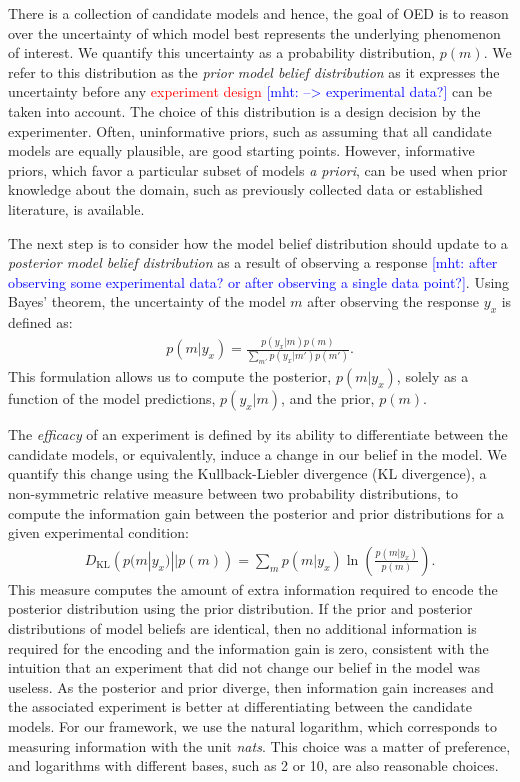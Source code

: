 \documentclass{article}
\newcommand{\red}[1]{\textcolor{Red}{#1}}
\newcommand{\mht}[1]{\textcolor{Blue}{[mht: #1]}}
\begin{document}
There is a collection of candidate models and hence, the goal of OED is to reason over the uncertainty of which model best represents the underlying phenomenon of interest. We quantify this uncertainty as a probability distribution, $p(m)$. We refer to this distribution as the \emph{prior model belief distribution} as it expresses the uncertainty before any \red{experiment design} \mht{--> experimental data?} can be taken into account. The choice of this distribution is a design decision by the experimenter. Often, uninformative priors, such as assuming that all candidate models are equally plausible, are good starting points. However, informative priors, which favor a particular subset of models \emph{a priori}, can be used when prior knowledge about the domain, such as previously collected data or established literature, is available. 

The next step is to consider how the model belief distribution should update to a \emph{posterior model belief distribution} as a result of observing a response \mht{after observing some experimental data? or after observing a single data point?}. Using Bayes' theorem, the uncertainty of the model $m$ after observing the response $y_x$ is defined as:
\begin{align}
p(m|y_x) = \frac{p(y_x|m)p(m)}{\sum\limits_{m'} p(y_x|m')p(m')}. \label{eq:bayes}
\end{align}
This formulation allows us to compute the posterior, $p(m|y_x)$, solely as a function of the model predictions, $p(y_x|m)$, and the prior, $p(m)$.

The \emph{efficacy} of an experiment is defined by its ability to differentiate between the candidate models, or equivalently, induce a change in our belief in the model. We quantify this change using the Kullback-Liebler divergence (KL divergence), a non-symmetric relative measure between two probability distributions, to compute the information gain between the posterior and prior distributions for a given experimental condition:
\begin{align}
D_{\text{KL}}\left(p(m|y_x) || p(m)\right) = \sum\limits_m p(m|y_x) \ln \left( \frac{p(m|y_x)}{p(m)}\right). \label{eq:kl}
\end{align}
This measure computes the amount of extra information required to encode the posterior distribution using the prior distribution. If the prior and posterior distributions of model beliefs are identical, then no additional information is required for the encoding and the information gain is zero, consistent with the intuition that an experiment that did not change our belief in the model was useless. As the posterior and prior diverge, then information gain increases and the associated experiment is better at differentiating between the candidate models. For our framework, we use the natural logarithm, which corresponds to measuring information with the unit \emph{nats}. This choice was a matter of preference, and logarithms with different bases, such as 2 or 10, are also reasonable choices. 
\end{document}
